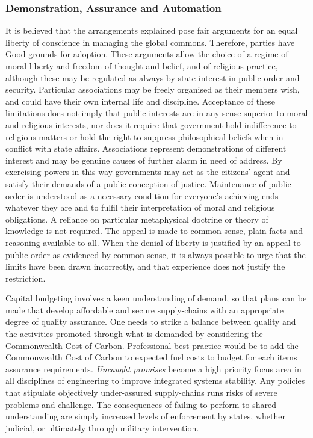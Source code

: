\documentclass[11pt, oneside]{article}   	%
\begin{document}
\subsubsection{Demonstration, Assurance and Automation}
It is believed that the arrangements explained pose fair arguments for an equal liberty of conscience in managing the global commons.
Therefore, parties have Good grounds for adoption.
These arguments allow the choice of a regime of moral liberty and freedom of thought and belief, and of religious practice, although these may be regulated as always by state interest in public order and security.
Particular associations may be freely organised as their members wish, and could have their own internal life and discipline.
Acceptance of these limitations does not imply that public interests are in any sense superior to moral and religious interests, nor does it require that government hold indifference to religious matters or hold the right to suppress philosophical beliefs when in conflict with state affairs.
Associations represent demonstrations of different interest and may be genuine causes of further alarm in need of address.
By exercising powers in this way governments may act as the citizens' agent and satisfy their demands of a public conception of justice.
Maintenance of public order is understood as a necessary condition for everyone's achieving ends whatever they are and to fulfil their interpretation of moral and religious obligations.
A reliance on particular metaphysical doctrine or theory of knowledge is not required.
The appeal is made to common sense, plain facts and reasoning available to all.
When the denial of liberty is justified by an appeal to public order as evidenced by common sense, it is always possible to urge that the limits have been drawn incorrectly, and that experience does not justify the restriction.\

Capital budgeting involves a keen understanding of demand, so that plans can be made that develop affordable and secure supply-chains with an appropriate degree of quality assurance.
One needs to strike a balance between quality and the activities promoted through what is demanded by considering the Commonwealth Cost of Carbon.
Professional best practice would be to add the Commonwealth Cost of Carbon to expected fuel costs to budget for each items assurance requirements.
\emph{Uncaught promises} become a high priority focus area in all disciplines of engineering to improve integrated systems stability.
Any policies that stipulate objectively under-assured supply-chains runs risks of severe problems and challenge.
The consequences of failing to perform to shared understanding are simply increased levels of enforcement by states, whether judicial, or ultimately through military intervention.\
\end{document}
